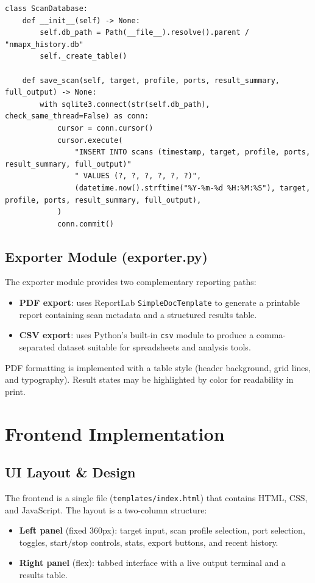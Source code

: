 \documentclass[12pt, a4paper]{report}
\begin{document}
\begin{lstlisting}[caption={Database initialization and save method (database.py)},label={lst:db}]
class ScanDatabase:
    def __init__(self) -> None:
        self.db_path = Path(__file__).resolve().parent / "nmapx_history.db"
        self._create_table()

    def save_scan(self, target, profile, ports, result_summary, full_output) -> None:
        with sqlite3.connect(str(self.db_path), check_same_thread=False) as conn:
            cursor = conn.cursor()
            cursor.execute(
                "INSERT INTO scans (timestamp, target, profile, ports, result_summary, full_output)"
                " VALUES (?, ?, ?, ?, ?, ?)",
                (datetime.now().strftime("%Y-%m-%d %H:%M:%S"), target, profile, ports, result_summary, full_output),
            )
            conn.commit()
\end{lstlisting}

\subsection{Exporter Module (exporter.py)}
The exporter module provides two complementary reporting paths:
\begin{itemize}[leftmargin=2.2em]
  \item \textbf{PDF export}: uses ReportLab \texttt{SimpleDocTemplate} to generate a printable report containing scan metadata and a structured results table.
  \item \textbf{CSV export}: uses Python's built-in \texttt{csv} module to produce a comma-separated dataset suitable for spreadsheets and analysis tools.
\end{itemize}

PDF formatting is implemented with a table style (header background, grid lines, and typography). Result states may be highlighted by color for readability in print.

\section{Frontend Implementation}

\subsection{UI Layout \& Design}
The frontend is a single file (\texttt{templates/index.html}) that contains HTML, CSS, and JavaScript. The layout is a two-column structure:
\begin{itemize}[leftmargin=2.2em]
  \item \textbf{Left panel} (fixed 360px): target input, scan profile selection, port selection, toggles, start/stop controls, stats, export buttons, and recent history.
  \item \textbf{Right panel} (flex): tabbed interface with a live output terminal and a results table.
\end{itemize}
\end{document}
